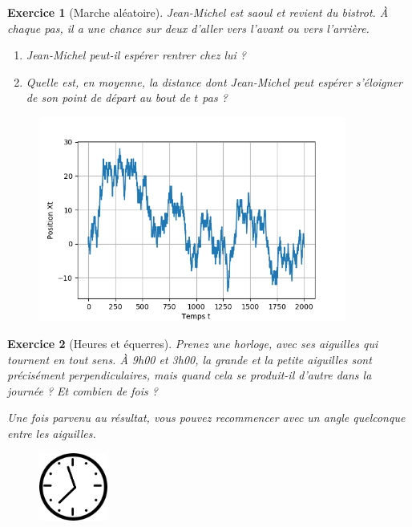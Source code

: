 \documentclass[12pt]{article}
\theoremstyle{break}
\newtheorem{exo}{Exercice}
\begin{document}
\begin{exo}[Marche aléatoire]
Jean-Michel est saoul et revient du bistrot. À chaque pas, il a une chance sur deux d'aller vers l'avant ou vers l'arrière.
\begin{enumerate}
\item Jean-Michel peut-il espérer rentrer chez lui ?
\item Quelle est, en moyenne, la distance dont Jean-Michel peut espérer s'éloigner de son point de départ au bout de $t$ pas ?
\end{enumerate}
\begin{figure}[!ht]
\centering
\includegraphics[width=0.9\textwidth]{marcheJM.png}
\end{figure}

\end{exo}


\begin{exo}[Heures et équerres]
Prenez une horloge, avec ses aiguilles qui tournent en tout sens. À 9h00 et 3h00, la grande et la petite aiguilles sont précisément perpendiculaires, mais quand cela se produit-il d'autre dans la journée ? Et combien de fois ?

Une fois parvenu au résultat, vous pouvez recommencer avec un angle quelconque entre les aiguilles.

\begin{figure}[h!]
	\centering
    \includegraphics[width=0.2\textwidth]{horloge.png}
\end{figure}
\end{exo}
\end{document}
